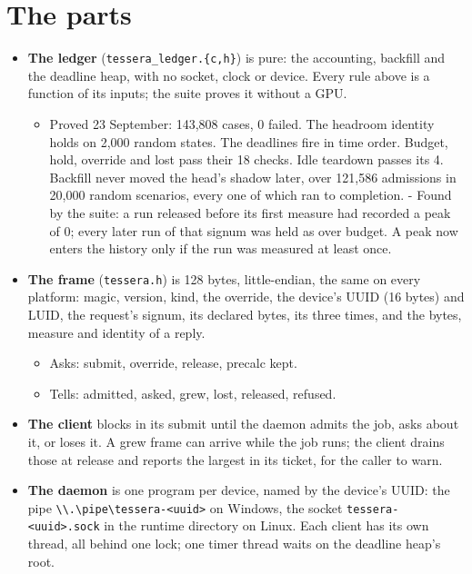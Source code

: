 \section{\texorpdfstring{The parts}{The parts}}

\begin{itemize}
\item \textbf{The ledger} (\texttt{tessera\_\allowbreak{}ledger.\allowbreak{}\{c,h\}}) is pure: the accounting, backfill and the deadline heap, with no socket, clock or device. Every rule above is a function of its inputs; the suite proves it without a GPU.

\begin{itemize}
\item Proved 23 September: 143,808 cases, 0 failed. The headroom identity holds on 2,000 random states. The deadlines fire in time order. Budget, hold, override and lost pass their 18 checks. Idle teardown passes its 4. Backfill never moved the head's shadow later, over 121,586 admissions in 20,000 random scenarios, every one of which ran to completion.  - Found by the suite: a run released before its first measure had recorded a peak of 0; every later run of that signum was held as over budget. A peak now enters the history only if the run was measured at least once.
\end{itemize}
\item \textbf{The frame} (\texttt{tessera.\allowbreak{}h}) is 128 bytes, little-endian, the same on every platform: magic, version, kind, the override, the device's UUID (16 bytes) and LUID, the request's signum, its declared bytes, its three times, and the bytes, measure and identity of a reply.

\begin{itemize}
\item Asks: submit, override, release, precalc kept.
\item Tells: admitted, asked, grew, lost, released, refused.
\end{itemize}
\item \textbf{The client} blocks in its submit until the daemon admits the job, asks about it, or loses it. A grew frame can arrive while the job runs; the client drains those at release and reports the largest in its ticket, for the caller to warn.
\item \textbf{The daemon} is one program per device, named by the device's UUID: the pipe \texttt{\textbackslash{}\textbackslash{}.\allowbreak{}\textbackslash{}pipe\textbackslash{}tessera-\allowbreak{}<uuid>} on Windows, the socket \texttt{tessera-\allowbreak{}<uuid>.\allowbreak{}sock} in the runtime directory on Linux. Each client has its own thread, all behind one lock; one timer thread waits on the deadline heap's root.


\end{itemize}
